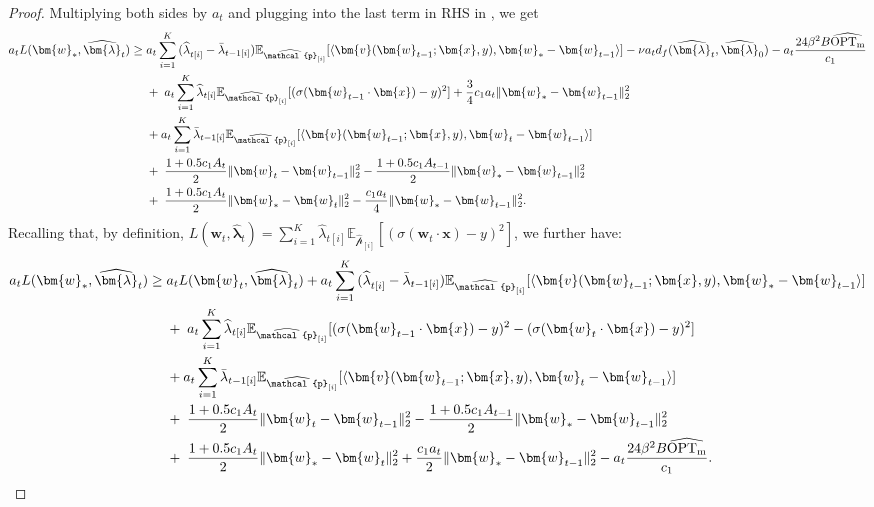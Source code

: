 \documentclass[11pt]{article}
\numberwithin{thm}{section}
\theoremstyle{plain}
\theoremstyle{definition}
\theoremstyle{remark} \newtheorem{remark}[thm]{Remark}
\def\vlambda{{\bm{\lambda}}}
\def\vv{{\bm{v}}}
\def\vw{{\bm{w}}}
\def\vx{{\bm{x}}}
\def\ep{\widehat{\mathcal{p}}}
\newcommand{\E}{\mathbb{E}}
\newcommand{\innp}[1]{\langle #1 \rangle}
\DeclarePairedDelimiter\norm{\|}{\|}
\newcommand{\epi}{\ep_{[i]}}
\newcommand{\elambda}{\widehat{\lambda}}
\newcommand{\evlambda}{\widehat{\vlambda}}
\DeclareMathOperator{\mOPT}{OPT_m}
\newcommand{\mOPThat}{\widehat{\mOPT}}
\begin{document}
\begin{proof}
Multiplying  both sides by \(a_t\) and plugging  into the last term in RHS in , we get
   \begin{align}
        a_t L(\vw_*, \evlambda_t)
		\ge \; & a_t \sum_{i=1}^K{(\elambda}_{t[i]} -\bar\lambda_{t-1[i]})\E_{\epi}[\innp{\vv(\vw_{t-1};\vx,y), \vw_*-\vw_{t-1}}]  -\nu a_t  d_f(\evlambda_t, \evlambda_0) - a_t \frac{24\beta^2B\mOPThat}{c_1} \notag \\
		&+ \; a_t \sum_{i=1}^K\elambda_{t[i]}  \E_{\epi}[(\sigma(\vw_{t-1}\cdot \vx)-y)^2] + \frac34 c_1a_t\norm{\vw_*-\vw_{t-1}}_2^2 \notag \\
        &   + a_t\sum_{i=1}^K\bar{\lambda}_{t-1[i]}\E_{\epi}[\innp{\vv(\vw_{t-1};\vx,y), \vw_t-\vw_{t-1}}] \notag \\
        &+ \;\frac{1+0.5c_1A_t}{2}\|\vw_t-\vw_{t-1}\|_2^2-\frac{1+0.5c_1A_{t-1}}{2}\|\vw_*-\vw_{t-1}\|_2^2 \notag \\
		&+ \;\frac{1+0.5c_1A_t}{2}\|\vw_*-\vw_t\|_2^2-\frac{c_1a_t}{4}\|\vw_*-\vw_{t-1}\|_2^2.\notag
    \end{align}
Recalling that, by definition, $L(\vw_t,\evlambda_t) = \sum_{i=1}^K\elambda_{t[i]}  \E_{\epi}[(\sigma(\vw_{t}\cdot \vx)-y)^2]$, we further have:
\begin{align}\label{eq:lb-three-terms}
         a_t L(\vw_*, \evlambda_t)
		\ge \; & a_tL(\vw_t,\evlambda_t) + a_t \sum_{i=1}^K{(\elambda}_{t[i]} -\bar\lambda_{t-1[i]})\E_{\epi}[\innp{\vv(\vw_{t-1};\vx,y), \vw_*-\vw_{t-1}}]    \notag \\
		&+ \; a_t \sum_{i=1}^K\elambda_{t[i]}  \E_{\epi}[(\sigma(\vw_{t-1}\cdot \vx)-y)^2-(\sigma(\vw_t\cdot \vx)-y)^2]  \notag \\
        &   + a_t\sum_{i=1}^K\bar{\lambda}_{t-1[i]}\E_{\epi}[\innp{\vv(\vw_{t-1};\vx,y), \vw_t-\vw_{t-1}}] \notag \\
        &+ \;\frac{1+0.5c_1A_t}{2}\|\vw_t-\vw_{t-1}\|_2^2-\frac{1+0.5c_1A_{t-1}}{2}\|\vw_*-\vw_{t-1}\|_2^2 \notag \\
		&+ \;\frac{1+0.5c_1A_t}{2}\|\vw_*-\vw_t\|_2^2 + \frac{c_1a_t}{2}\norm{\vw_*-\vw_{t-1}}_2^2- a_t \frac{24\beta^2B\mOPThat}{c_1}.
    \end{align}


\end{proof}
\end{document}
